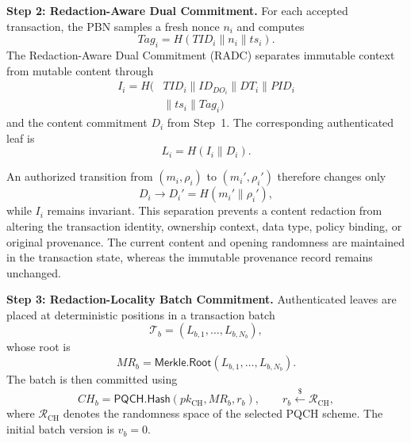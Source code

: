 \documentclass[lettersize,journal]{IEEEtran}
\begin{document}
\medskip
\noindent\textbf{Step 2: Redaction-Aware Dual Commitment.}
For each accepted transaction, the PBN samples a fresh nonce $n_i$ and
computes
\begin{equation}
Tag_i=H(TID_i\parallel n_i\parallel ts_i).
\end{equation}
The Redaction-Aware Dual Commitment (RADC) separates immutable context
from mutable content through
\begin{equation}
\begin{aligned}
I_i=H(&TID_i\parallel ID_{DO_i}\parallel DT_i
\parallel PID_i\\
&\parallel ts_i\parallel Tag_i)
\end{aligned}
\end{equation}
and the content commitment $D_i$ from Step~1. The corresponding
authenticated leaf is
\begin{equation}
L_i=H(I_i\parallel D_i).
\end{equation}

An authorized transition from $(m_i,\rho_i)$ to
$(m_i',\rho_i')$ therefore changes only
\begin{equation}
D_i\rightarrow D_i'=H(m_i'\parallel\rho_i'),
\end{equation}
while $I_i$ remains invariant. This separation prevents a content
redaction from altering the transaction identity, ownership context,
data type, policy binding, or original provenance. The current content
and opening randomness are maintained in the transaction state, whereas
the immutable provenance record remains unchanged.

\medskip
\noindent\textbf{Step 3: Redaction-Locality Batch Commitment.}
Authenticated leaves are placed at deterministic positions in a
transaction batch
\begin{equation}
\mathcal{T}_b=(L_{b,1},\ldots,L_{b,N_b}),
\end{equation}
whose root is
\begin{equation}
MR_b=
\mathsf{Merkle.Root}(L_{b,1},\ldots,L_{b,N_b}).
\end{equation}
The batch is then committed using
\begin{equation}
CH_b=
\mathsf{PQCH.Hash}(pk_{\mathrm{CH}},MR_b,r_b),
\qquad
r_b\stackrel{\$}{\leftarrow}\mathcal{R}_{\mathrm{CH}},
\end{equation}
where $\mathcal{R}_{\mathrm{CH}}$ denotes the randomness space of the
selected PQCH scheme. The initial batch version is $v_b=0$.
\end{document}
